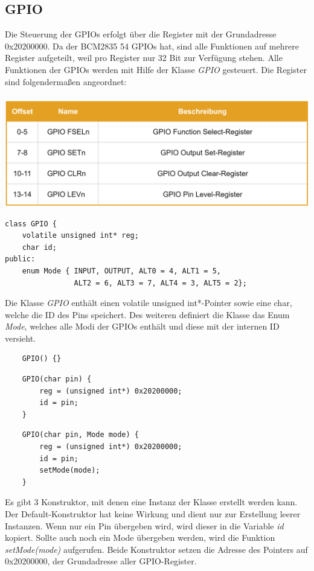 \documentclass[12pt]{article}
\begin{document}
\subsection{GPIO}
Die Steuerung der GPIOs erfolgt über die Register mit der Grundadresse 0x20200000. Da der BCM2835 54 GPIOs hat, sind alle Funktionen auf mehrere Register aufgeteilt, weil pro Register nur 32 Bit zur Verfügung stehen. Alle Funktionen der GPIOs werden mit Hilfe der Klasse \textit{GPIO} gesteuert. Die Register sind folgendermaßen angeordnet:\\\\
\includegraphics[width=\textwidth]{img/gpio_table.png}
\begin{center}\end{center}
\begin{verbatim}
class GPIO {
    volatile unsigned int* reg;
    char id;
public:
    enum Mode { INPUT, OUTPUT, ALT0 = 4, ALT1 = 5, 
                ALT2 = 6, ALT3 = 7, ALT4 = 3, ALT5 = 2};
\end{verbatim}
\vspace{-2mm}
Die Klasse \textit{GPIO} enthält einen volatile unsigned int*-Pointer sowie eine char, welche die ID des Pins speichert. Des weiteren definiert die Klasse das Enum \textit{Mode}, welches alle Modi der GPIOs enthält und diese mit der internen ID versieht.\\
\begin{verbatim}
    GPIO() {}
\end{verbatim}
\begin{verbatim}
    GPIO(char pin) {
        reg = (unsigned int*) 0x20200000;
        id = pin;
    }
\end{verbatim}
\begin{verbatim}
    GPIO(char pin, Mode mode) {
        reg = (unsigned int*) 0x20200000;
        id = pin;
        setMode(mode);
    }
\end{verbatim}
\vspace{-2mm}
Es gibt 3 Konstruktor, mit denen eine Instanz der Klasse erstellt werden kann. Der Default-Konstruktor hat keine Wirkung und dient nur zur Erstellung leerer Instanzen. Wenn nur ein Pin übergeben wird, wird dieser in die Variable \textit{id} kopiert. Sollte auch noch ein Mode übergeben werden, wird die Funktion \textit{setMode(mode)} aufgerufen. Beide Konstruktor setzen die Adresse des Pointers auf 0x20200000, der Grundadresse aller GPIO-Register.\\
\end{document}
